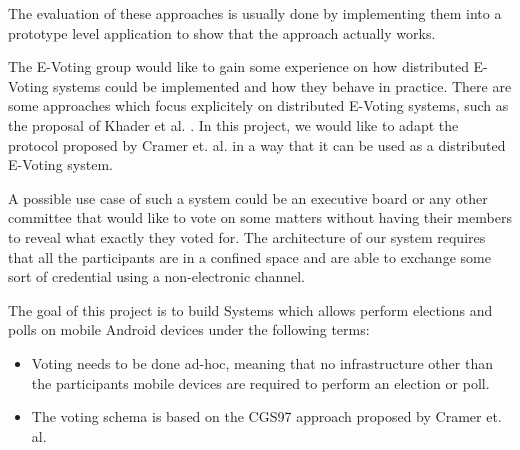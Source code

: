 \documentclass[numbers=noenddot, abstract=on]{scrreprt}
\begin{document}
The evaluation of these approaches is usually done by implementing them into a
prototype level application to show that the approach actually works.

The E-Voting group would like to gain some experience on how distributed
E-Voting systems could be implemented and how they behave in practice. There are
some approaches which focus explicitely on distributed E-Voting systems, such as
the proposal of Khader et al. \cite{HKRS12}. In this project, we would like to
adapt the protocol proposed by Cramer et. al. \cite{CGS97} in a way that it can
be used as a distributed E-Voting system.

A possible use case of such a system could be an executive board or any other
committee that would like to vote on some matters without having their members
to reveal what exactly they voted for. The architecture of our system requires
that all the participants are in a confined space and are able to exchange some
sort of credential using a non-electronic channel.

The goal of this project is to build Systems which allows perform elections and
polls on mobile Android devices under the following terms:
\begin{itemize}
  \item Voting needs to be done ad-hoc, meaning that no infrastructure other
  than the participants mobile devices are required to perform an election or
  poll.
  \item The voting schema is based on the CGS97 approach proposed by Cramer et.
  al. \cite{CGS97}
\end{itemize}


\printbibliography
\end{document}
